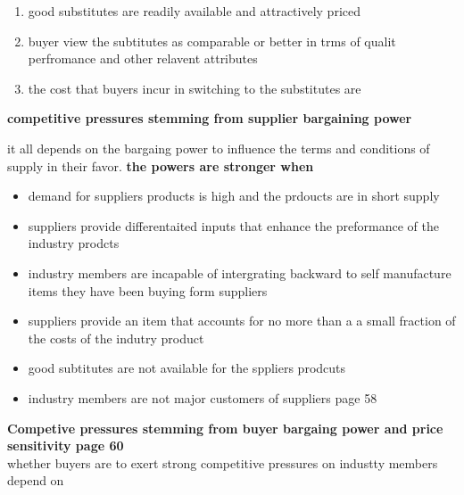 \documentclass{report}
\begin{document}
\begin{enumerate}
\item good substitutes are readily available and attractively priced 
\item buyer view the subtitutes as comparable or better in trms of qualit perfromance and other relavent attributes 
\item the cost that buyers incur in switching to the substitutes are 
\end{enumerate}

{\huge\textbf{competitive pressures stemming from supplier bargaining power}}

it all depends on the bargaing power to influence the terms and conditions of supply in their favor. 
\textbf{the powers are stronger when}
\begin{itemize}
\item demand for suppliers products is high and the prdoucts are in short supply 
\item suppliers provide differentaited inputs that enhance the preformance of the industry  prodcts 
\item industry members are incapable of intergrating backward to self manufacture items they have been buying  form suppliers 
\item suppliers provide an item that accounts for no more than a a small fraction of the costs of the indutry product
\item good subtitutes are not available for the sppliers  prodcuts 
\item industry members are not major customers of suppliers
page 58 

\end{itemize}

{\huge\textbf{Competive pressures stemming from buyer  bargaing power and price sensitivity page 60} }\\

whether buyers are to exert strong competitive pressures on industty members depend on 
\end{document}
